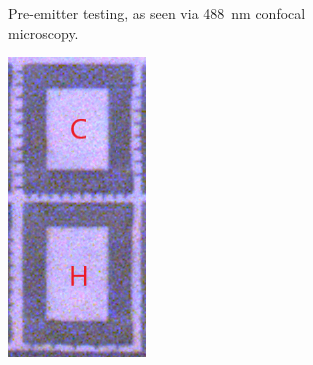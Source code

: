 \begin{refsection}
\begin{figure}[H]
\begin{subfigure}[b]{0.33\textwidth}
        \caption{Pre-emitter testing, as seen via 488~\si{\nano\metre} confocal microscopy.}
        \label{fig:ch_narrow_esid}
    \end{subfigure}
    \hfill %
    \begin{subfigure}[b]{0.315\textwidth}
        \centering
        \includegraphics[width=\linewidth]{Chapter7/Figs/Raster/ch_narrow_pre_testing_afm.png}

\end{subfigure}
\end{figure}
\end{refsection}

